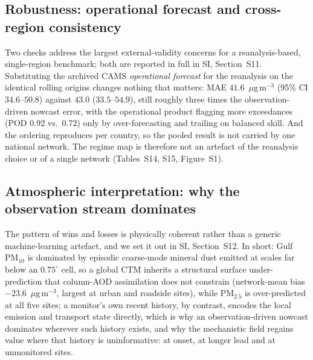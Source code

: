 \documentclass[review,times,authoryear]{elsarticle}
\newcommand*{\ugm}{\ensuremath{\mu\mathrm{g\,m^{-3}}}}
\newcommand*{\pmtf}{\ensuremath{\mathrm{PM_{2.5}}}}
\newcommand*{\pmten}{\ensuremath{\mathrm{PM_{10}}}}
\begin{document}
\subsection{Robustness: operational forecast and cross-region consistency}
Two checks address the largest external-validity concerns for a reanalysis-based, single-region benchmark; both are reported in full in SI, Section~S11. Substituting the archived CAMS \emph{operational forecast} for the reanalysis on the identical rolling origins changes nothing that matters: MAE $41.6$~\ugm{} (95\% CI $34.6$--$50.8$) against $43.0$ ($33.5$--$54.9$), still roughly three times the observation-driven nowcast error, with the operational product flagging more exceedances (POD $0.92$ vs.\ $0.72$) only by over-forecasting and trailing on balanced skill. And the ordering reproduces per country, so the pooled result is not carried by one national network. The regime map is therefore not an artefact of the reanalysis choice or of a single network (Tables~S14, S15, Figure~S1).


\subsection{Atmospheric interpretation: why the observation stream dominates}
The pattern of wins and losses is physically coherent rather than a generic machine-learning artefact, and we set it out in SI, Section~S12. In short: Gulf \pmten{} is dominated by episodic coarse-mode mineral dust emitted at scales far below an $0.75^\circ$ cell, so a global CTM inherits a structural surface under-prediction that column-AOD assimilation does not constrain (network-mean bias $-23.6$~\ugm{}, largest at urban and roadside sites), while \pmtf{} is over-predicted at all five sites; a monitor's own recent history, by contrast, encodes the local emission and transport state directly, which is why an observation-driven nowcast dominates wherever such history exists, and why the mechanistic field regains value where that history is uninformative: at onset, at longer lead and at unmonitored sites.
\end{document}
